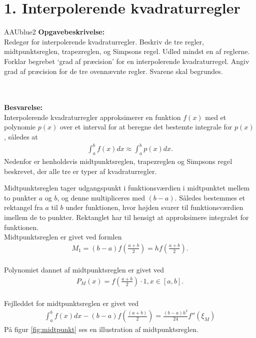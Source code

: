 \section*{1. Interpolerende kvadraturregler}
% 
%
\begin{color}{AAUblue2}
%
\textbf{Opgavebeskrivelse:} \\
Redegør for interpolerende kvadraturregler. 
Beskriv de tre regler, midtpunktsreglen, trapezreglen, og Simpsons regel. 
Udled mindst en af reglerne. Forklar begrebet ‘grad af præcision’ for en interpolerende kvadraturregel. 
Angiv grad af præcision for de tre ovennævnte regler. 
Svarene skal begrundes.
% 
\end{color}
\\\\
%  
\textbf{Besvarelse:} \\
Interpolerende kvadraturregler approksimerer en funktion $f(x)$ med et polynomie $p(x)$ over et interval for at beregne det bestemte integrale for $p(x)$, således at 
\begin{align}
    \int_{a}^{b} f(x) dx \approx \int_{a}^{b} p(x) dx.
\end{align}
Nedenfor er henholdsvis midtpunktsreglen, trapezreglen og Simpsons regel beskrevet, der alle tre er typer af kvadraturregler.  

Midtpunktsreglen tager udgangspunkt i funktionsværdien i midtpunktet mellem to punkter $a$ og $b$, og denne multipliceres med $(b-a)$.
Således bestemmes et rektangel fra $a$ til $b$ under funktionen, hvor højden svarer til funktionsværdien imellem de to punkter. 
Rektanglet har til hensigt at approksimere integralet for funktionen. \\
Midtpunktsreglen er givet ved formlen
\begin{align*}
M_1 = (b-a)f(\frac{a+b}{2})=hf(\frac{a+b}{2}).    
\end{align*}
\\
Polynomiet dannet af midtpunktsreglen er givet ved  
\begin{align*}
P_{M}(x)=f(\frac{a+b}{2}) \cdot 1, x \in \left [a,b  \right ].
\end{align*}
\\
Fejlleddet for midtpunktsreglen er givet ved 
\begin{align*}
\int_{a}^{b}f(x)dx-(b-a)f(\frac{(a+b)}{2})=\frac{(b-a)h^2}{24}{f}''(\xi_M)
\end{align*}
På figur \ref{fig:midtpunkt} ses en illustration af midtpunktsreglen. 


